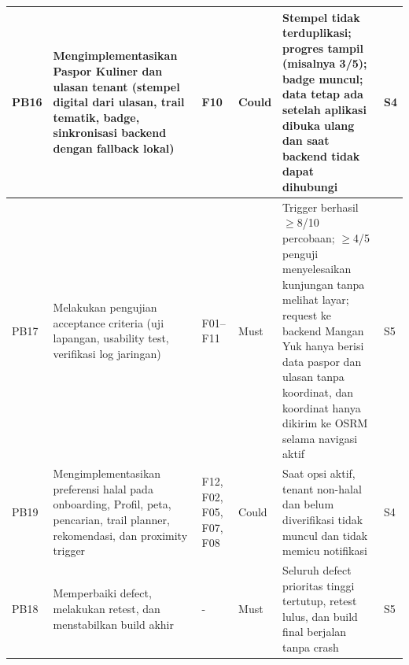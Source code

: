\begin{longtable}{|L{0.118}|L{0.281}|L{0.172}|L{0.107}|L{0.208}|L{0.114}|}
PB16 & Mengimplementasikan Paspor Kuliner dan ulasan tenant (stempel digital dari ulasan, trail tematik, badge, sinkronisasi backend dengan fallback lokal) & F10 & Could & Stempel tidak terduplikasi; progres tampil (misalnya 3/5); badge muncul; data tetap ada setelah aplikasi dibuka ulang dan saat backend tidak dapat dihubungi & S4 \\ \hline
PB17 & Melakukan pengujian acceptance criteria (uji lapangan, usability test, verifikasi log jaringan) & F01--F11 & Must & Trigger berhasil \(\ge\)8/10 percobaan; \(\ge\)4/5 penguji menyelesaikan kunjungan tanpa melihat layar; request ke backend Mangan Yuk hanya berisi data paspor dan ulasan tanpa koordinat, dan koordinat hanya dikirim ke OSRM selama navigasi aktif & S5 \\ \hline
PB19 & Mengimplementasikan preferensi halal pada onboarding, Profil, peta, pencarian, trail planner, rekomendasi, dan proximity trigger & F12, F02, F05, F07, F08 & Could & Saat opsi aktif, tenant non-halal dan belum diverifikasi tidak muncul dan tidak memicu notifikasi & S4 \\ \hline
PB18 & Memperbaiki defect, melakukan retest, dan menstabilkan build akhir & - & Must & Seluruh defect prioritas tinggi tertutup, retest lulus, dan build final berjalan tanpa crash & S5 \\ \hline
\end{longtable}
